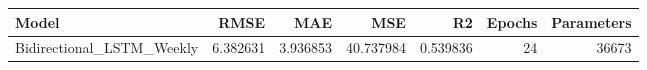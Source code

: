 \begin{tabular}{lrrrrrr}
\toprule
Model & RMSE & MAE & MSE & R2 & Epochs & Parameters \\
\midrule
Bidirectional_LSTM_Weekly & 6.382631 & 3.936853 & 40.737984 & 0.539836 & 24 & 36673 \\
\bottomrule
\end{tabular}
